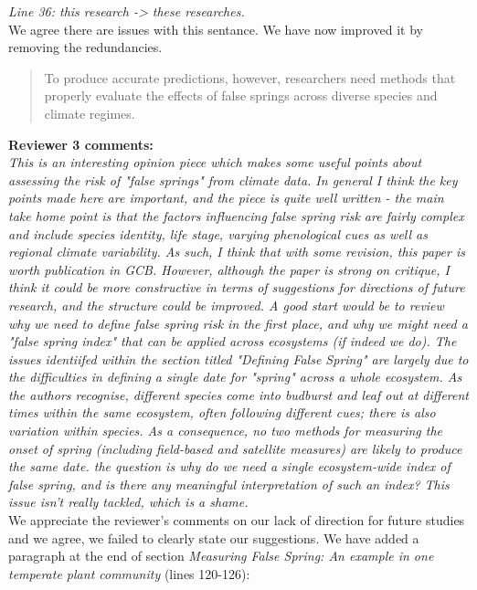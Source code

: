 \documentclass[11pt,a4paper]{article}
\begin{document}
\textit{Line 36: this research -> these researches.}\\

We agree there are issues with this sentance. We have now improved it by removing the redundancies. \\

\begin{quote}
To produce accurate predictions, however, researchers need methods that properly evaluate the effects of false springs across diverse species and climate regimes. 
\end{quote} 

\textbf{ Reviewer 3 comments:} \\

\textit{This is an interesting opinion piece which makes some useful points about assessing the risk of "false springs" from climate data.  In general I think the key points made here are important, and the piece is quite well written - the main take home point is that the factors influencing false spring risk are fairly complex and include species identity, life stage, varying phenological cues as well as regional climate variability.  As such, I think that with some revision, this paper is worth publication in GCB. However, although the paper is strong on critique, I think it could be more constructive in terms of suggestions for directions of future research, and the structure could be improved.  A good start would be to review why we need to define false spring risk in the first place, and why we might need a "false spring index" that can be applied across ecosystems (if indeed we do).  The issues identiifed within the section titled "Defining False Spring" are largely due to the difficulties in defining a single date for "spring" across a whole ecosystem.  As the authors recognise, different species come into budburst and leaf out at different times within the same ecosystem, often following different cues; there is also variation within species.  As a consequence, no two methods for measuring the onset of spring (including field-based and satellite measures) are likely to produce the same date.  the question is why do we need a single ecosystem-wide index of false spring, and is there any meaningful interpretation of such an index?  This issue isn't really tackled, which is a shame. } \\

We appreciate the reviewer's comments on our lack of direction for future studies and we agree, we failed to clearly state our suggestions. We have added a paragraph at the end of section \textit{Measuring False Spring: An example in one temperate plant community} (lines 120-126): \\
\end{document}

